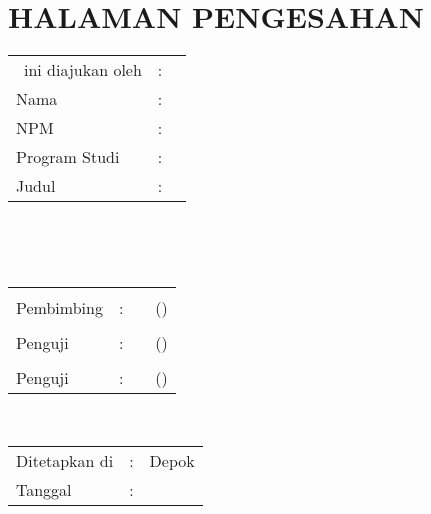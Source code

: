 %
%
%

\chapter*{HALAMAN PENGESAHAN}

\vspace*{0.4cm}
\noindent

\noindent
\begin{tabular}{ll p{9cm}}
	\type~ini diajukan oleh & : &          \\
	Nama                    & : & \penulis \\
	NPM                     & : & \npm     \\
	Program Studi           & : & \program \\
	Judul \type             & : & \judul   \\
\end{tabular} \\

\vspace*{1.0cm}

\noindent {}\\[0.2cm]

\begin{center}
\end{center}

\vspace*{0.3cm}

\begin{tabular}{l l l l }
	           &   &              &                   \\
	Pembimbing & : & \pembimbing  & (\hspace*{3.0cm}) \\
	           &   &              &                   \\
	Penguji    & : & \pengujisatu & (\hspace*{3.0cm}) \\
	           &   &              &                   \\
	Penguji    & : & \pengujidua  & (\hspace*{3.0cm}) \\
\end{tabular}\\


\vspace*{2.0cm}

\begin{tabular}{ll l}
	Ditetapkan di & : & Depok         \\
	Tanggal       & : & \tanggalLulus \\
\end{tabular}


\newpage